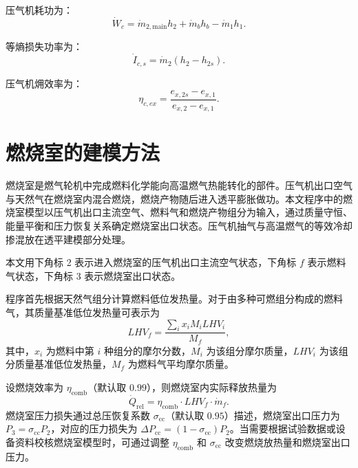 压气机耗功为：
\begin{equation}\label{eq:compressor-power}
\dot{W}_c
=
\dot{m}_{2,\mathrm{main}} h_2
+
\dot{m}_b h_b
-
\dot{m}_1 h_1.
\end{equation}

等熵损失功率为：
\begin{equation}\label{eq:compressor-isentropic-loss}
\dot{I}_{c,s}
=
\dot{m}_2
\left(
h_2-h_{2s}
\right).
\end{equation}

压气机㶲效率为：
\begin{equation}\label{eq:compressor-exergy-eff}
\eta_{c,ex}
=
\frac{e_{x,2s}-e_{x,1}}{e_{x,2}-e_{x,1}}.
\end{equation}

\section{燃烧室的建模方法}

燃烧室是燃气轮机中完成燃料化学能向高温燃气热能转化的部件。压气机出口空气与天然气在燃烧室内混合燃烧，燃烧产物随后进入透平膨胀做功。本文程序中的燃烧室模型以压气机出口主流空气、燃料气和燃烧产物组分为输入，通过质量守恒、能量平衡和压力恢复关系确定燃烧室出口状态。压气机抽气与高温燃气的等效冷却掺混放在透平建模部分处理。

本文用下角标 2 表示进入燃烧室的压气机出口主流空气状态，下角标 $f$ 表示燃料气状态，下角标 3 表示燃烧室出口状态。

程序首先根据天然气组分计算燃料低位发热量。对于由多种可燃组分构成的燃料气，其质量基准低位发热量可表示为
\begin{equation}\label{eq:fuel-lhv}
LHV_f
=
\frac{
\sum_i x_i M_i LHV_i
}{
M_f
},
\end{equation}
其中，$x_i$ 为燃料中第 $i$ 种组分的摩尔分数，$M_i$ 为该组分摩尔质量，$LHV_i$ 为该组分质量基准低位发热量，$M_f$ 为燃料气平均摩尔质量。

设燃烧效率为 $\eta_{\mathrm{comb}}$（默认取 $0.99$），则燃烧室内实际释放热量为
\begin{equation}\label{eq:combustion-heat-release}
\dot{Q}_{\mathrm{rel}}
=
\eta_{\mathrm{comb}} \cdot LHV_f \cdot \dot{m}_f.
\end{equation}
燃烧室压力损失通过总压恢复系数 $\sigma_{\mathrm{cc}}$（默认取 $0.95$）描述，燃烧室出口压力为 $P_3 = \sigma_{\mathrm{cc}} P_2$，对应的压力损失为 $\Delta P_{\mathrm{cc}} = (1-\sigma_{\mathrm{cc}})P_2$。当需要根据试验数据或设备资料校核燃烧室模型时，可通过调整 $\eta_{\mathrm{comb}}$ 和 $\sigma_{\mathrm{cc}}$ 改变燃烧放热量和燃烧室出口压力。

